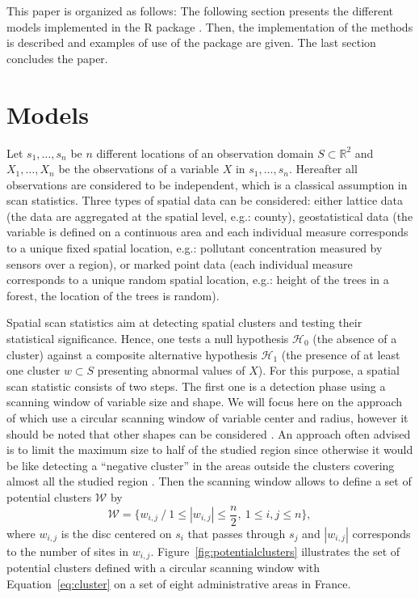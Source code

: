 \noindent This paper is organized as follows: The following section presents the different models implemented in the R package . Then, the implementation of the methods is described and examples of use of the package are given. The last section concludes the paper.\\

\section{Models} \label{sec:method}

\noindent Let $s_1, \dots, s_n$ be $n$ different locations of an observation domain $S \subset \mathbb{R}^2$ and $X_1, \dots, X_n$ be the observations of a variable $X$ in $s_1, \dots, s_n$. Hereafter all observations are considered to be independent, which is a classical assumption in scan statistics. Three types of spatial data can be considered: either lattice data (the data  are aggregated at the spatial level, e.g.: county), geostatistical data (the variable is defined on a continuous area and each individual measure corresponds to a unique fixed spatial location, e.g.: pollutant concentration measured by sensors over a region), or marked point data (each individual measure corresponds to a unique random spatial location, e.g.: height of the trees in a forest, the location of the trees is random). 

\noindent Spatial scan statistics aim at detecting spatial clusters and testing their statistical significance. Hence, one tests a null hypothesis $\mathcal{H}_0$ (the absence of a cluster) against a composite alternative hypothesis $\mathcal{H}_1$ (the presence of at least one cluster $w \subset S$ presenting abnormal values of $X$). 
For this purpose, a spatial scan statistic consists of two steps. The first one is a detection phase using a scanning window of variable size and shape. We will focus here on the approach of \citet{spatialdisease} which use a circular scanning window of variable center and radius, however it should be noted that other shapes can be considered \citep{elliptic,cucala2013spatial}. An approach often advised is to limit the maximum size to half of the studied region since otherwise it would be like detecting a ``negative cluster'' in the areas outside the clusters covering almost all the studied region \citep{spatialdisease}. Then the scanning window allows to define a set of potential clusters $\mathcal{W}$ by
\begin{equation} \label{eq:cluster}
\mathcal{W} = \{ w_{i,j} \ / \ 1 \le |w_{i,j}| \le \frac{n}{2}, \ 1 \le i,j \le n \},
\end{equation}
where $w_{i,j}$ is the disc centered on $s_i$ that passes through $s_j$ and $|w_{i,j}|$ corresponds to the number of sites in $w_{i,j}$.
Figure~\ref{fig:potentialclusters} illustrates the set of potential clusters defined with a circular scanning window with Equation~\ref{eq:cluster} on a set of eight administrative areas in France.

